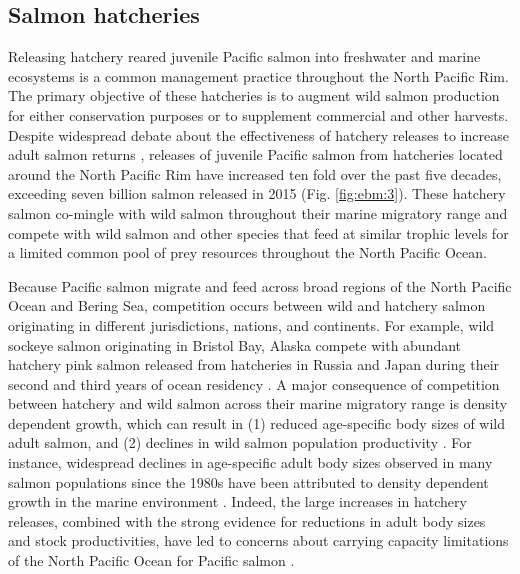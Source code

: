 \subsection{Salmon hatcheries}

Releasing hatchery reared juvenile Pacific salmon into freshwater and
marine ecosystems is a common management practice throughout the North
Pacific Rim. The primary objective of these hatcheries is to augment
wild salmon production for either conservation purposes or to supplement
commercial and other harvests. Despite widespread debate about the
effectiveness of hatchery releases to increase adult salmon returns
\citep{Hilborn2000a, Wertheimer2001a, Hilborn2001a}, releases of
juvenile Pacific salmon from hatcheries located around the North Pacific
Rim have increased ten fold over the past five decades, exceeding seven
billion salmon released in 2015 (Fig. \ref{fig:ebm:3}). These hatchery salmon
co-mingle with wild salmon throughout their marine migratory range and compete
with wild salmon and other species that feed at similar trophic levels for a
limited common pool of prey resources throughout the North Pacific Ocean.

Because Pacific salmon migrate and feed across broad regions of the
North Pacific Ocean and Bering Sea, competition occurs between wild and
hatchery salmon originating in different jurisdictions, nations, and
continents. For example, wild sockeye salmon originating in Bristol Bay,
Alaska compete with abundant hatchery pink salmon released from
hatcheries in Russia and Japan during their second and third years of
ocean residency \citep{Ruggerone2003a}. A major consequence of
competition between hatchery and wild salmon across their marine
migratory range is density dependent growth, which can result in (1)
reduced age-specific body sizes of wild adult salmon, and (2) declines
in wild salmon population productivity
\citep{Ruggerone2015, Ruggerone2003a}. For instance, widespread declines
in age-specific adult body sizes observed in many salmon populations
since the 1980s have been attributed to density dependent growth in the
marine environment \citep{Ricker1981a, Ishida1993a, Pyper1999a}. Indeed,
the large increases in hatchery releases, combined with the strong
evidence for reductions in adult body sizes and stock productivities,
have led to concerns about carrying capacity limitations of the North
Pacific Ocean for Pacific salmon \citep{Pearcy1999a, Nielsen2009a}.

